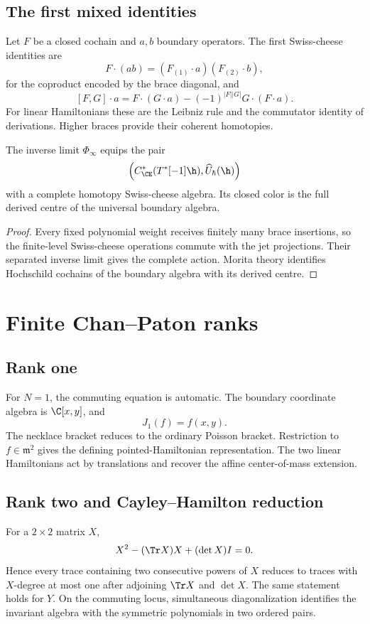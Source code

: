 \section{The first mixed identities}
Let $F$ be a closed cochain and $a,b$ boundary operators.  The first Swiss-cheese identities are
\[
 F\cdot(ab)=(F_{(1)}\cdot a)(F_{(2)}\cdot b),
\]
for the coproduct encoded by the brace diagonal, and
\[
 [F,G]\cdot a
 =F\cdot(G\cdot a)-(-1)^{|F||G|}G\cdot(F\cdot a).
\]
For linear Hamiltonians these are the Leibniz rule and the commutator identity of derivations.  Higher braces provide their coherent homotopies.

\begin{corollary}
The inverse limit $\Phi_\infty$ equips the pair
\[
 \left(
 C^*_{\CE}(T^*[-1]\h),
 \widehat U_\hbar(\h)
 \right)
\]
with a complete homotopy Swiss-cheese algebra.  Its closed color is the full derived centre of the universal boundary algebra.
\end{corollary}
\begin{proof}
Every fixed polynomial weight receives finitely many brace insertions, so the finite-level Swiss-cheese operations commute with the jet projections.  Their separated inverse limit gives the complete action.  Morita theory identifies Hochschild cochains of the boundary algebra with its derived centre.
\end{proof}

\chapter{Finite Chan--Paton ranks}
\section{Rank one}
For $N=1$, the commuting equation is automatic.  The boundary coordinate algebra is $\C[x,y]$, and
\[
 J_1(f)=f(x,y).
\]
The necklace bracket reduces to the ordinary Poisson bracket.  Restriction to $f\in\mathfrak m^2$ gives the defining pointed-Hamiltonian representation.  The two linear Hamiltonians act by translations and recover the affine center-of-mass extension.

\section{Rank two and Cayley--Hamilton reduction}
For a $2\times2$ matrix $X$,
\[
 X^2-(\Tr X)X+(\det X)I=0.
\]
Hence every trace containing two consecutive powers of $X$ reduces to traces with $X$-degree at most one after adjoining $\Tr X$ and $\det X$.  The same statement holds for $Y$.  On the commuting locus, simultaneous diagonalization identifies the invariant algebra with the symmetric polynomials in two ordered pairs.

